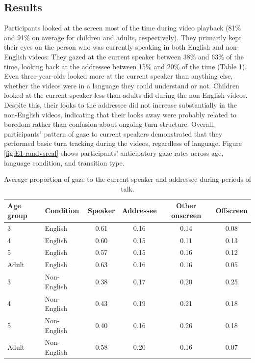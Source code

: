 \documentclass[authoryear, 12pt]{elsarticle}
\begin{document}
\subsection{Results}
\label{sec:results1}

Participants looked at the screen most of the time during video playback (81\% and 91\% on average for children and adults, respectively). They primarily kept their eyes on the person who was currently speaking in both English and non-English videos: They gazed at the current speaker between 38\% and 63\% of the time, looking back at the addressee between 15\% and 20\% of the time (Table \ref{tab:e1_look}). Even three-year-olds looked more at the current speaker than anything else, whether the videos were in a language they could understand or not. Children looked at the current speaker less than adults did during the non-English videos. Despite this, their looks to the addressee did not increase substantially in the non-English videos, indicating that their looks away were probably related to boredom rather than confusion about ongoing turn structure. Overall, participants' pattern of gaze to current speakers demonstrated that they performed basic turn tracking during the videos, regardless of language. Figure \ref{fig:E1-randvsreal} shows participants' anticipatory gaze rates across age, language condition, and transition type.

\begin{table}[t]
\begin{center}
  \begin{tabular}{llcccc}
    \hline
    Age group & Condition & Speaker & Addressee & Other onscreen & Offscreen\\ 
    \hline
    3 & English & 0.61 & 0.16 & 0.14 & 0.08 \\ 
    4 & English & 0.60 & 0.15 & 0.11 & 0.13 \\ 
    5 & English & 0.57 & 0.15 & 0.16 & 0.12 \\ 
    Adult & English & 0.63 & 0.16 & 0.16 & 0.05 \\ 
    3 & Non-English & 0.38 & 0.17 & 0.20 & 0.25 \\ 
    4 & Non-English & 0.43 & 0.19 & 0.21 & 0.18 \\ 
    5 & Non-English & 0.40 & 0.16 & 0.26 & 0.18 \\ 
    Adult & Non-English & 0.58 & 0.20 & 0.16 & 0.07 \\ 
    \hline
  \end{tabular}
\end{center}
  \caption{Average proportion of gaze to the current speaker and addressee during periods of talk.}
\label{tab:e1_look}
\end{table}
\end{document}
